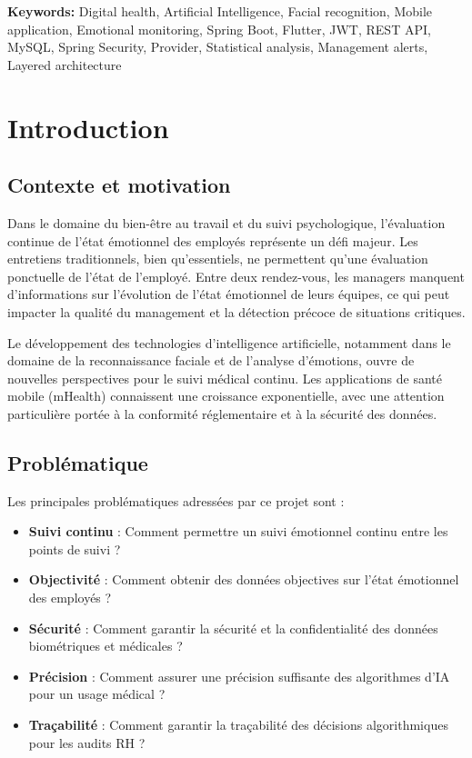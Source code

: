 \documentclass[a4paper,11pt]{report}
\begin{document}
\textbf{Keywords:} Digital health, Artificial Intelligence, Facial recognition, Mobile application, Emotional monitoring, Spring Boot, Flutter, JWT, REST API, MySQL, Spring Security, Provider, Statistical analysis, Management alerts, Layered architecture

\tableofcontents
\newpage
\listoffigures
\newpage
\listoftables
\newpage

\chapter{Introduction}

\section{Contexte et motivation}

Dans le domaine du bien-être au travail et du suivi psychologique, l'évaluation continue de l'état émotionnel des employés représente un défi majeur. Les entretiens traditionnels, bien qu'essentiels, ne permettent qu'une évaluation ponctuelle de l'état de l'employé. Entre deux rendez-vous, les managers manquent d'informations sur l'évolution de l'état émotionnel de leurs équipes, ce qui peut impacter la qualité du management et la détection précoce de situations critiques.

Le développement des technologies d'intelligence artificielle, notamment dans le domaine de la reconnaissance faciale et de l'analyse d'émotions, ouvre de nouvelles perspectives pour le suivi médical continu. Les applications de santé mobile (mHealth) connaissent une croissance exponentielle, avec une attention particulière portée à la conformité réglementaire et à la sécurité des données.

\section{Problématique}

Les principales problématiques adressées par ce projet sont :

\begin{itemize}
    \item \textbf{Suivi continu} : Comment permettre un suivi émotionnel continu entre les points de suivi ?
    \item \textbf{Objectivité} : Comment obtenir des données objectives sur l'état émotionnel des employés ?
    \item \textbf{Sécurité} : Comment garantir la sécurité et la confidentialité des données biométriques et médicales ?
    \item \textbf{Précision} : Comment assurer une précision suffisante des algorithmes d'IA pour un usage médical ?
    \item \textbf{Traçabilité} : Comment garantir la traçabilité des décisions algorithmiques pour les audits RH ?
\end{itemize}
\end{document}
